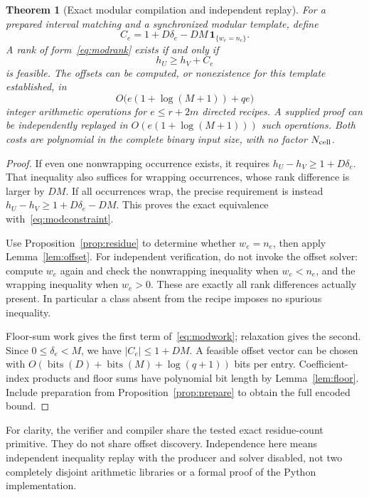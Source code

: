 \documentclass[11pt,letterpaper]{article}
\newtheorem{theorem}{Theorem}[section]
\theoremstyle{definition}
\theoremstyle{remark}\newtheorem{remark}[theorem]{Remark}
\newcommand{\bits}{\operatorname{bits}}
\begin{document}
\begin{theorem}[Exact modular compilation and independent replay]
\label{thm:modular}
For a prepared interval matching and a synchronized modular template, define
\begin{equation}
 C_e=1+D\delta_e-DM\,\mathbf 1_{\{w_e=n_e\}}.
 \label{eq:modconstraint}
\end{equation}
A rank of form~\eqref{eq:modrank} exists if and only if
\begin{equation}
                          h_U\geq h_V+C_e
 \label{eq:modsystem}
\end{equation}
is feasible. The offsets can be computed, or nonexistence for this template established, in
\begin{equation}
           O\bigl(e(1+\log(M+1))+qe\bigr)
 \label{eq:modwork}
\end{equation}
integer arithmetic operations for $e\leq r+2m$ directed recipes. A supplied proof can be independently replayed in $O(e(1+\log(M+1)))$ such operations. Both costs are polynomial in the complete binary input size, with no factor $N_{\rm cell}$.
\end{theorem}
\begin{proof}
If even one nonwrapping occurrence exists, it requires
$h_U-h_V\geq1+D\delta_e$. That inequality also suffices for wrapping occurrences, whose rank difference is larger by $DM$. If all occurrences wrap, the precise requirement is instead
$h_U-h_V\geq1+D\delta_e-DM$. This proves the exact equivalence with~\eqref{eq:modconstraint}.

Use Proposition~\ref{prop:residue} to determine whether $w_e=n_e$, then apply Lemma~\ref{lem:offset}. For independent verification, do not invoke the offset solver: compute $w_e$ again and check the nonwrapping inequality when $w_e<n_e$, and the wrapping inequality when $w_e>0$. These are exactly all rank differences actually present. In particular a class absent from the recipe imposes no spurious inequality.

Floor-sum work gives the first term of~\eqref{eq:modwork}; relaxation gives the second. Since $0\leq\delta_e<M$, we have $|C_e|\leq1+DM$. A feasible offset vector can be chosen with $O(\bits(D)+\bits(M)+\log(q+1))$ bits per entry. Coefficient-index products and floor sums have polynomial bit length by Lemma~\ref{lem:floor}. Include preparation from Proposition~\ref{prop:prepare} to obtain the full encoded bound.
\end{proof}

For clarity, the verifier and compiler share the tested exact residue-count primitive. They do not share offset discovery. Independence here means independent inequality replay with the producer and solver disabled, not two completely disjoint arithmetic libraries or a formal proof of the Python implementation.
\end{document}
